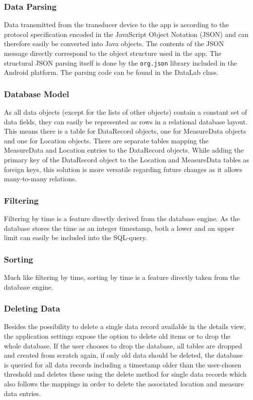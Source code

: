 \subsubsection{Data Parsing}
Data transmitted from the transducer device to the app is according to the protocol specification encoded in the JavaScript Object Notation (JSON) and can therefore easily be converted into Java objects. The contents of the JSON message directly correspond to the object structure used in the app. The structural JSON parsing itself is done by the \texttt{org.json} library included in the Android platform. The parsing code can be found in the DataLab class.

\subsubsection{Database Model}
As all data objects (except for the lists of other objects) contain a constant set of data fields, they can easily be represented as rows in a relational database layout. This means there is a table for DataRecord objects, one for MeasureData objects and one for Location objects. There are separate tables mapping the MeasureData and Location entries to the DataRecord objects. While adding the primary key of the DataRecord object to the Location and MeasureData tables as foreign keys, this solution is more versatile regarding future changes as it allows many-to-many relations.

\subsubsection{Filtering}
\label{subsubs:filter-tech}
Filtering by time is a feature directly derived from the database engine. As the database stores the time as an integer timestamp, both a lower and an upper limit can easily be included into the SQL-query.

\subsubsection{Sorting}
Much like filtering by time, sorting by time is a feature directly taken from the database engine.

\subsubsection{Deleting Data}
Besides the possibility to delete a single data record available in the details view, the application settings expose the option to delete old items or to drop the whole database. If the user chooses to drop the database, all tables are dropped and created from scratch again, if only old data should be deleted, the database is queried for all data records including a timestamp older than the user-chosen threshold and deletes these using the delete method for single data records which also follows the mappings in order to delete the associated location and measure data entries.

